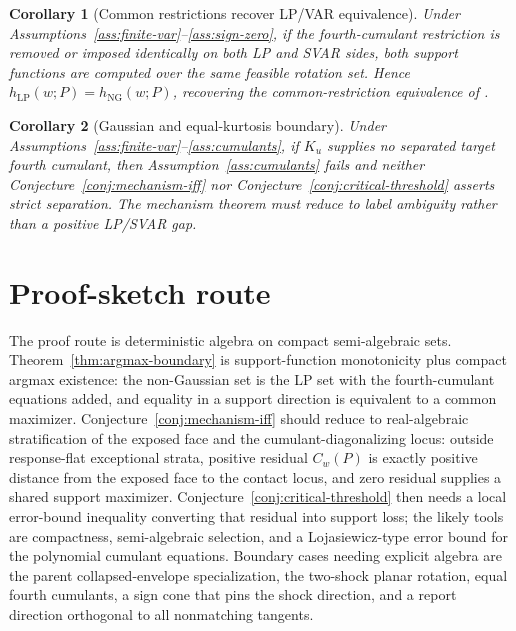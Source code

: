 \documentclass[11pt]{article}
\theoremstyle{definition}
\theoremstyle{plain}
\newtheorem{corollary}{Corollary}
\theoremstyle{remark}
\begin{document}
\begin{corollary}[Common restrictions recover LP/VAR equivalence]\label{cor:common}
Under Assumptions~\ref{ass:finite-var}--\ref{ass:sign-zero}, if the fourth-cumulant restriction is removed or imposed identically on both LP and SVAR sides, both support functions are computed over the same feasible rotation set.  Hence \(h_{\mathrm{LP}}(w;P)=h_{\mathrm{NG}}(w;P)\), recovering the common-restriction equivalence of \citet{PlagborgMollerWolf2021}.
\end{corollary}

\begin{corollary}[Gaussian and equal-kurtosis boundary]\label{cor:gaussian}
Under Assumptions~\ref{ass:finite-var}--\ref{ass:cumulants}, if \(K_u\) supplies no separated target fourth cumulant, then Assumption~\ref{ass:cumulants} fails and neither Conjecture~\ref{conj:mechanism-iff} nor Conjecture~\ref{conj:critical-threshold} asserts strict separation.  The mechanism theorem must reduce to label ambiguity rather than a positive LP/SVAR gap.
\end{corollary}

\section{Proof-sketch route}
The proof route is deterministic algebra on compact semi-algebraic sets.  Theorem~\ref{thm:argmax-boundary} is support-function monotonicity plus compact argmax existence: the non-Gaussian set is the LP set with the fourth-cumulant equations added, and equality in a support direction is equivalent to a common maximizer.  Conjecture~\ref{conj:mechanism-iff} should reduce to real-algebraic stratification of the exposed face and the cumulant-diagonalizing locus: outside response-flat exceptional strata, positive residual \(C_w(P)\) is exactly positive distance from the exposed face to the contact locus, and zero residual supplies a shared support maximizer.  Conjecture~\ref{conj:critical-threshold} then needs a local error-bound inequality converting that residual into support loss; the likely tools are compactness, semi-algebraic selection, and a Lojasiewicz-type error bound for the polynomial cumulant equations.  Boundary cases needing explicit algebra are the parent collapsed-envelope specialization, the two-shock planar rotation, equal fourth cumulants, a sign cone that pins the shock direction, and a report direction orthogonal to all nonmatching tangents.
\end{document}
